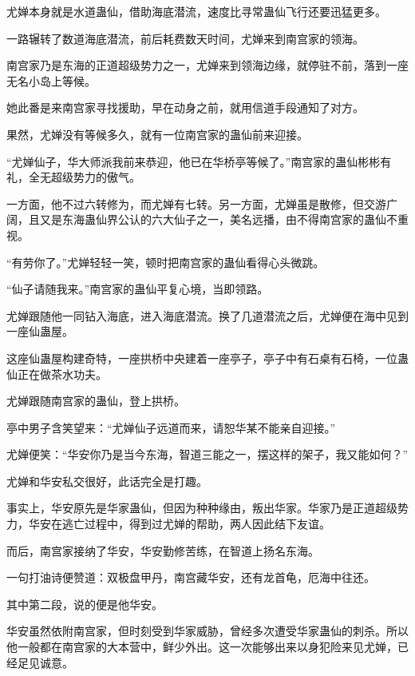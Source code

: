 
\begin{this_body}



尤婵本身就是水道蛊仙，借助海底潜流，速度比寻常蛊仙飞行还要迅猛更多。

一路辗转了数道海底潜流，前后耗费数天时间，尤婵来到南宫家的领海。

南宫家乃是东海的正道超级势力之一，尤婵来到领海边缘，就停驻不前，落到一座无名小岛上等候。

她此番是来南宫家寻找援助，早在动身之前，就用信道手段通知了对方。

果然，尤婵没有等候多久，就有一位南宫家的蛊仙前来迎接。

“尤婵仙子，华大师派我前来恭迎，他已在华桥亭等候了。”南宫家的蛊仙彬彬有礼，全无超级势力的傲气。

一方面，他不过六转修为，而尤婵有七转。另一方面，尤婵虽是散修，但交游广阔，且又是东海蛊仙界公认的六大仙子之一，美名远播，由不得南宫家的蛊仙不重视。

“有劳你了。”尤婵轻轻一笑，顿时把南宫家的蛊仙看得心头微跳。

“仙子请随我来。”南宫家的蛊仙平复心境，当即领路。

尤婵跟随他一同钻入海底，进入海底潜流。换了几道潜流之后，尤婵便在海中见到一座仙蛊屋。

这座仙蛊屋构建奇特，一座拱桥中央建着一座亭子，亭子中有石桌有石椅，一位蛊仙正在做茶水功夫。

尤婵跟随南宫家的蛊仙，登上拱桥。

亭中男子含笑望来：“尤婵仙子远道而来，请恕华某不能亲自迎接。”

尤婵便笑：“华安你乃是当今东海，智道三能之一，摆这样的架子，我又能如何？”

尤婵和华安私交很好，此话完全是打趣。

事实上，华安原先是华家蛊仙，但因为种种缘由，叛出华家。华家乃是正道超级势力，华安在逃亡过程中，得到过尤婵的帮助，两人因此结下友谊。

而后，南宫家接纳了华安，华安勤修苦练，在智道上扬名东海。

一句打油诗便赞道：双极盘甲丹，南宫藏华安，还有龙首龟，厄海中往还。

其中第二段，说的便是他华安。

华安虽然依附南宫家，但时刻受到华家威胁，曾经多次遭受华家蛊仙的刺杀。所以他一般都在南宫家的大本营中，鲜少外出。这一次能够出来以身犯险来见尤婵，已经足见诚意。


\end{this_body}
